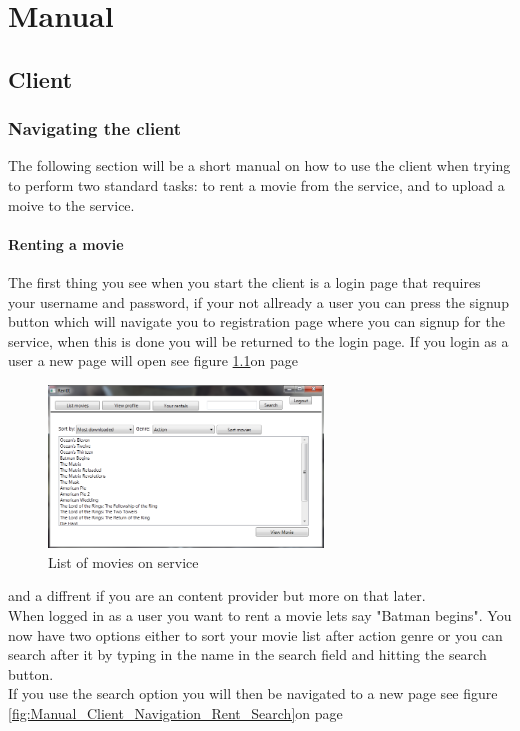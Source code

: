 \chapter{Manual}
\label{Manual}

\section{Client}
\label{Manual_Client}

\subsection{Navigating the client}
\label{Manual_Client_Navigation}
The following section will be a short manual on how to use the client when trying to perform two standard tasks: to rent a movie from the service, and to upload a moive to the service.

\subsubsection{Renting a movie}
\label{Manual_Client_Navigation_Rent}
The first thing you see when you start the client is a login page that requires your username and password, if your not allready a user you can press the signup button which will navigate you to registration page where you can signup for the service, when this is done you will be returned to the login page. If you login as a user a new page will open see figure \ref{fig:Manual_Client_Navigation_Rent_List}on page \pageref{fig:Manual_Client_Navigation_Rent_List}

\begin{figure}[h!] 
\caption{List of movies on service} 
\label{fig:Manual_Client_Navigation_Rent_List}
  \centering
 \includegraphics[width=0.65\textwidth]{Parts/Images/Manual/Listmovies}
\end{figure}
 
and a diffrent if you are an content provider but more on that later.
\\When logged in as a user you want to rent a movie lets say "Batman begins". You now have two options either to sort your movie list after action genre or you can search after it by typing in the name in the search field and hitting the search button.
\\If you use the search option you will then be navigated to a new page see figure \ref{fig:Manual_Client_Navigation_Rent_Search}on page \pageref{fig:Manual_Client_Navigation_Rent_Search}


